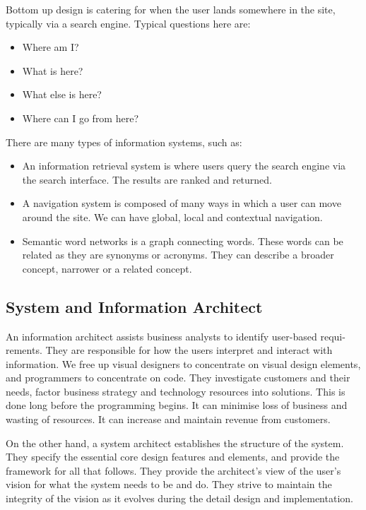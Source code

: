 \documentclass[a4paper, openany]{memoir}
\begin{document}
\noindent Bottom up design is catering for when the user lands somewhere in the site, typically via a search engine. Typical questions here are:
\begin{itemize}
    \item Where am I?
    \item What is here?
    \item What else is here?
    \item Where can I go from here?
\end{itemize}

\noindent There are many types of information systems, such as:
\begin{itemize}
    \item An information retrieval system is where users query the search engine via the search interface. The results are ranked and returned. 
    \item A navigation system is composed of many ways in which a user can move around the site. We can have global, local and contextual navigation.
    \item Semantic word networks is a graph connecting words. These words can be related as they are synonyms or acronyms. They can describe a broader concept, narrower or a related concept.
\end{itemize}

\subsection{System and Information Architect}
An information architect assists business analysts to identify user-based requi-rements. They are responsible for how the users interpret and interact with information. We free up visual designers to concentrate on visual design elements, and programmers to concentrate on code. They investigate customers and their needs, factor business strategy and technology resources into solutions. This is done long before the programming begins. It can minimise loss of business and wasting of resources. It can increase and maintain revenue from customers.

\noindent On the other hand, a system architect establishes the structure of the system. They specify the essential core design features and elements, and provide the framework for all that follows. They provide the architect's view of the user's vision for what the system needs to be and do. They strive to maintain the integrity of the vision as it evolves during the detail design and implementation.
\end{document}
